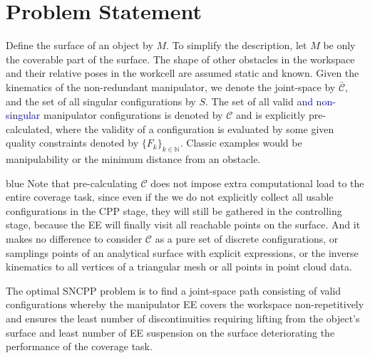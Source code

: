 \documentclass[Afour,sageh,times]{sagej}
\begin{document}
\section{Problem Statement}\label{section_problem_statement}
Define the surface of an object by $M$. To simplify the description, let $M$ be only the coverable part of the surface. 
The shape of other obstacles in the workspace and their relative poses in the workcell are assumed static and known.
Given the kinematics of the non-redundant manipulator, we denote the joint-space by $\bar{\mathscr{C}}$, and the set of all singular configurations by $S$. 
The set of all valid \textcolor{blue}{and non-singular} manipulator configurations is denoted by $\mathscr{C}$ and is explicitly pre-calculated, where the validity of a configuration is evaluated by some given quality constraints denoted by $\{F_k\}_{k\in \mathbb{N}}$. 
Classic examples would be manipulability or the minimum distance from an obstacle. 
\begin{color}{blue}
Note that pre-calculating $\mathscr{C}$ does not impose extra computational load to the entire coverage task, since even if the we do not explicitly collect all usable configurations in the CPP stage, they will still be gathered in the controlling stage, because the EE will finally visit all reachable points on the surface. 
And it makes no difference to consider $\mathscr{C}$ as a pure set of discrete configurations, or samplings points of an analytical surface with explicit expressions, or the inverse kinematics to all vertices of a triangular mesh or all points in point cloud data. 
\end{color}
The optimal SNCPP problem is to find a joint-space path consisting of valid configurations whereby the manipulator EE covers the workspace non-repetitively 
and ensures the least number of discontinuities requiring lifting from the object's surface and least number of EE suspension on the surface deteriorating the performance of the coverage task. 
\end{document}
